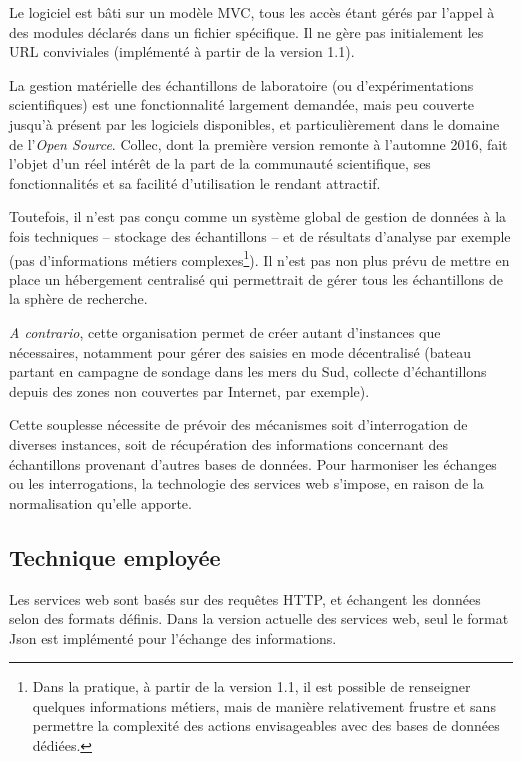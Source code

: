 Le logiciel est bâti sur un modèle MVC, tous les accès étant gérés par l'appel à des modules déclarés dans un fichier spécifique. Il ne gère pas initialement les URL conviviales (implémenté à partir de la version 1.1).

La gestion matérielle des échantillons de laboratoire (ou d'expérimentations scientifiques) est une fonctionnalité largement demandée, mais peu couverte jusqu'à présent par les logiciels disponibles, et particulièrement dans le domaine de l'\textit{Open Source}. Collec, dont la première version remonte à l'automne 2016, fait l'objet d'un réel intérêt de la part de la communauté scientifique, ses fonctionnalités et sa facilité d'utilisation le rendant attractif.

Toutefois, il n'est pas conçu comme un système global de gestion de données à la fois techniques -- stockage des échantillons -- et de résultats d'analyse par exemple (pas d'informations métiers complexes\footnote{Dans la pratique, à partir de la version 1.1, il est possible de renseigner quelques informations métiers, mais de manière relativement frustre et sans permettre la complexité des actions envisageables avec des bases de données dédiées.}).
Il n'est pas non plus prévu de mettre en place un hébergement centralisé qui permettrait de gérer tous les échantillons de la sphère de recherche.

\textit{A contrario}, cette organisation permet de créer autant d'instances que néces\-saires, notamment pour gérer des saisies en mode décentralisé (bateau partant en campagne de sondage dans les mers du Sud, collecte d'échantillons depuis des zones non couvertes par Internet, par exemple).

Cette souplesse nécessite de prévoir des mécanismes soit d'interrogation de diverses instances, soit de récupération des informations concernant des échantillons provenant d'autres bases de données. 
Pour harmoniser les échanges ou les interrogations, la technologie des services web s'impose, en raison de la normalisation qu'elle apporte.

\subsection{Technique employée}

Les services web sont basés sur des requêtes HTTP, et échangent les données selon des formats définis. Dans la version actuelle des services web, seul le format Json est implémenté pour l'échange des informations.

